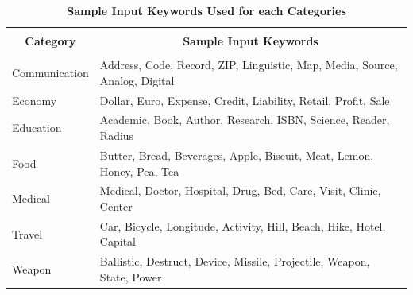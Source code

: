 \documentclass[12pt, oneside]{book}
\begin{document}
\begin{table}[h]
	\begin{center}
		\caption{\textbf{Sample Input Keywords Used for each Categories}}
		\begin{tabular}{| p{} | p{} |}
			\hline
			\multicolumn{1}{|c|}{} & \multicolumn{1}{c|}{} \\
			\multicolumn{1}{|c|}{\textbf{Category}} & \multicolumn{1}{c|}{\textbf{Sample Input Keywords}} \\
			\multicolumn{1}{|c|}{} & \multicolumn{1}{c|}{} \\
			\hline
			Communication & Address, Code, Record, ZIP, Linguistic, Map, Media, Source, Analog, Digital \\ \hline
			Economy &  Dollar, Euro, Expense, Credit, Liability, Retail, Profit, Sale\\ \hline
			Education & Academic, Book, Author, Research, ISBN, Science, Reader, Radius\\ \hline
			Food & Butter, Bread, Beverages, Apple, Biscuit, Meat, Lemon, Honey, Pea, Tea\\ \hline
			Medical & Medical, Doctor, Hospital, Drug, Bed, Care, Visit, Clinic, Center\\ \hline
			Travel & Car, Bicycle, Longitude, Activity, Hill, Beach, Hike, Hotel, Capital\\ \hline
			Weapon & Ballistic, Destruct, Device, Missile, Projectile, Weapon, State, Power\\ \hline
		\end{tabular}
	\end{center}
	\label{tab: sample_keyword_input}
\end{table}
\end{document}
